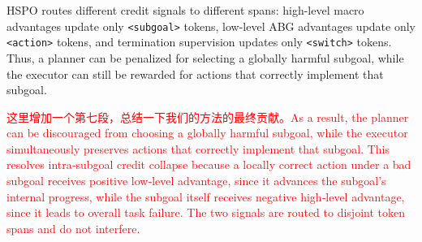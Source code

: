 \documentclass{article}
\newcommand{\wei}[1]{\textcolor{red}{#1}}
\begin{document}
HSPO routes different credit signals to different spans: high-level macro advantages update only \texttt{<subgoal>} tokens, low-level ABG advantages update only \texttt{<action>} tokens, and termination supervision updates only \texttt{<switch>} tokens. Thus, a planner can be penalized for selecting a globally harmful subgoal, while the executor can still be rewarded for actions that correctly implement that subgoal.


\wei{这里增加一个第七段，总结一下我们的方法的最终贡献。As a result, the planner can be discouraged from choosing a globally harmful subgoal, while the executor simultaneously preserves actions that correctly implement that subgoal. This resolves intra‑subgoal credit collapse because a locally correct action under a bad subgoal receives positive low‑level advantage, since it advances the subgoal’s internal progress, while the subgoal itself receives negative high‑level advantage, since it leads to overall task failure. The two signals are routed to disjoint token spans and do not interfere.}
\end{document}
